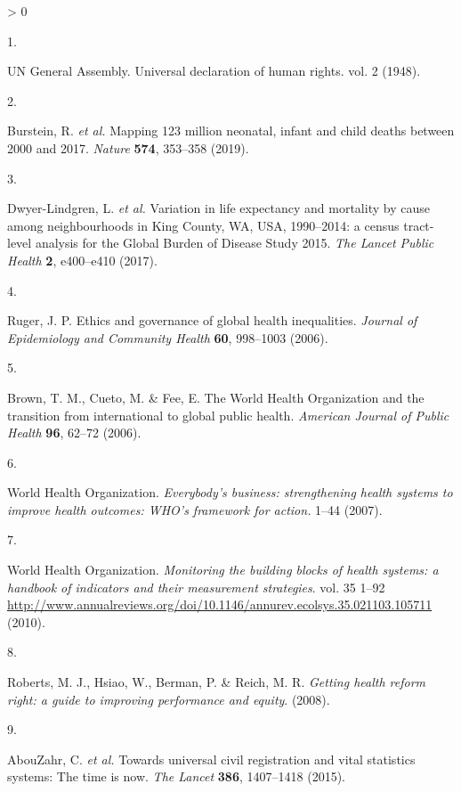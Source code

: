 \documentclass[
]{article}
\newlength{\cslhangindent}
\newlength{\csllabelwidth}
\newenvironment{CSLReferences}[2] %
 {%
  \setlength{\parindent}{0pt}
  \ifodd #1 \everypar{\setlength{\hangindent}{\cslhangindent}}\ignorespaces\fi
  \ifnum #2 > 0
  \setlength{\parskip}{#2\baselineskip}
  \fi
 }%
 {}
\newcommand{\CSLLeftMargin}[1]{\parbox[t]{\csllabelwidth}{#1}}
\newcommand{\CSLRightInline}[1]{\parbox[t]{\linewidth - \csllabelwidth}{#1}\break}
\begin{document}
\hypertarget{refs}{}
\begin{CSLReferences}{0}{0}
\leavevmode\hypertarget{ref-srs}{}%
\CSLLeftMargin{1. }
\CSLRightInline{UN General Assembly. {Universal declaration of human rights}. vol. 2 (1948).}

\leavevmode\hypertarget{ref-Burstein2019}{}%
\CSLLeftMargin{2. }
\CSLRightInline{Burstein, R. \emph{et al.} {Mapping 123 million neonatal, infant and child deaths between 2000 and 2017}. \emph{Nature} \textbf{574}, 353--358 (2019).}

\leavevmode\hypertarget{ref-Dwyer-Lindgren2017}{}%
\CSLLeftMargin{3. }
\CSLRightInline{Dwyer-Lindgren, L. \emph{et al.} {Variation in life expectancy and mortality by cause among neighbourhoods in King County, WA, USA, 1990--2014: a census tract-level analysis for the Global Burden of Disease Study 2015}. \emph{The Lancet Public Health} \textbf{2}, e400--e410 (2017).}

\leavevmode\hypertarget{ref-Ruger2006}{}%
\CSLLeftMargin{4. }
\CSLRightInline{Ruger, J. P. {Ethics and governance of global health inequalities}. \emph{Journal of Epidemiology and Community Health} \textbf{60}, 998--1003 (2006).}

\leavevmode\hypertarget{ref-Brown2006}{}%
\CSLLeftMargin{5. }
\CSLRightInline{Brown, T. M., Cueto, M. \& Fee, E. {The World Health Organization and the transition from international to global public health}. \emph{American Journal of Public Health} \textbf{96}, 62--72 (2006).}

\leavevmode\hypertarget{ref-WorldHealthOrganization2007}{}%
\CSLLeftMargin{6. }
\CSLRightInline{World Health Organization. \emph{{Everybody's business: strengthening health systems to improve health outcomes: WHO's framework for action.}} 1--44 (2007).}

\leavevmode\hypertarget{ref-WorldHealthOrganization2010}{}%
\CSLLeftMargin{7. }
\CSLRightInline{World Health Organization. \emph{{Monitoring the building blocks of health systems: a handbook of indicators and their measurement strategies}}. vol. 35 1--92 \url{http://www.annualreviews.org/doi/10.1146/annurev.ecolsys.35.021103.105711} (2010).}

\leavevmode\hypertarget{ref-Roberts2008}{}%
\CSLLeftMargin{8. }
\CSLRightInline{Roberts, M. J., Hsiao, W., Berman, P. \& Reich, M. R. \emph{{Getting health reform right: a guide to improving performance and equity}}. (2008).}

\leavevmode\hypertarget{ref-AbouZahr2015}{}%
\CSLLeftMargin{9. }
\CSLRightInline{AbouZahr, C. \emph{et al.} {Towards universal civil registration and vital statistics systems: The time is now}. \emph{The Lancet} \textbf{386}, 1407--1418 (2015).}


\end{CSLReferences}
\end{document}
